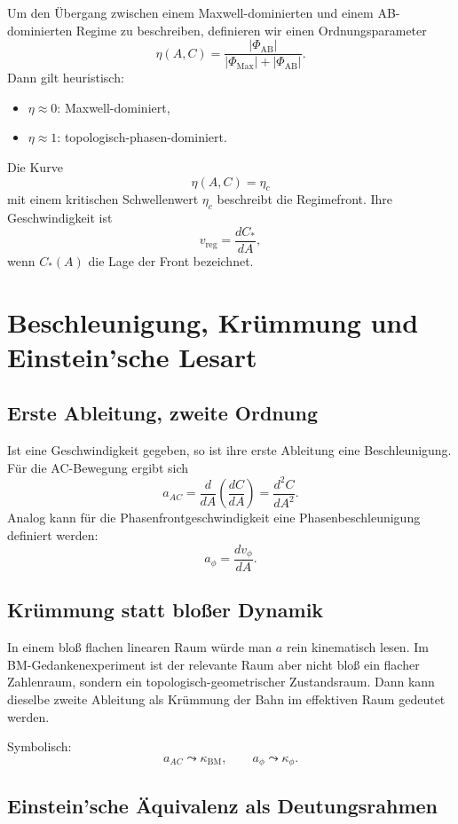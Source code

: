 \documentclass[11pt,a4paper]{article}
\theoremstyle{definition}
\theoremstyle{plain}
\begin{document}
	Um den Übergang zwischen einem Maxwell-dominierten und einem AB-dominierten Regime zu beschreiben, definieren wir einen Ordnungsparameter
	\[
	\eta(A,C)=\frac{|\Phi_{\mathrm{AB}}|}{|\Phi_{\mathrm{Max}}|+|\Phi_{\mathrm{AB}}|}.
	\]
	Dann gilt heuristisch:
	\begin{itemize}[leftmargin=2em]
		\item $\eta\approx 0$: Maxwell-dominiert,
		\item $\eta\approx 1$: topologisch-phasen-dominiert.
	\end{itemize}
	
	Die Kurve
	\[
	\eta(A,C)=\eta_c
	\]
	mit einem kritischen Schwellenwert $\eta_c$ beschreibt die Regimefront. Ihre Geschwindigkeit ist
	\[
	v_{\mathrm{reg}} = \frac{dC_*}{dA},
	\]
	wenn $C_*(A)$ die Lage der Front bezeichnet.
	
	\section{Beschleunigung, Krümmung und Einstein’sche Lesart}
	
	\subsection{Erste Ableitung, zweite Ordnung}
	
	Ist eine Geschwindigkeit gegeben, so ist ihre erste Ableitung eine Beschleunigung. Für die AC-Bewegung ergibt sich
	\[
	a_{AC} = \frac{d}{dA}\left(\frac{dC}{dA}\right) = \frac{d^2 C}{dA^2}.
	\]
	Analog kann für die Phasenfrontgeschwindigkeit eine Phasenbeschleunigung definiert werden:
	\[
	a_\phi = \frac{dv_\phi}{dA}.
	\]
	
	\subsection{Krümmung statt bloßer Dynamik}
	
	In einem bloß flachen linearen Raum würde man $a$ rein kinematisch lesen. Im BM-Gedankenexperiment ist der relevante Raum aber nicht bloß ein flacher Zahlenraum, sondern ein topologisch-geometrischer Zustandsraum. Dann kann dieselbe zweite Ableitung als Krümmung der Bahn im effektiven Raum gedeutet werden.
	
	Symbolisch:
	\[
	a_{AC}\leadsto \kappa_{\mathrm{BM}},
	\qquad
	a_\phi\leadsto \kappa_\phi.
	\]
	
	\subsection{Einstein’sche Äquivalenz als Deutungsrahmen}
	
\end{document}
